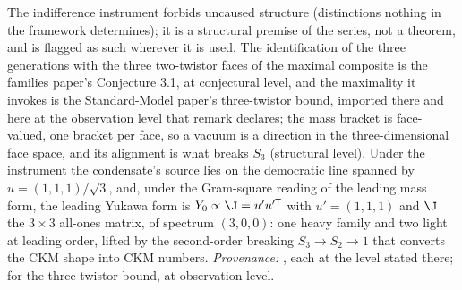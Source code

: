 The indifference instrument forbids uncaused structure (distinctions nothing in the framework determines); it is a structural premise of the series, not a theorem, and is flagged as such wherever it is used. The identification of the three generations with the three two-twistor faces of the maximal composite is the families paper's Conjecture 3.1, at conjectural level, and the maximality it invokes is the Standard-Model paper's three-twistor bound, imported there and here at the observation level that remark declares; the mass bracket is face-valued, one bracket per face, so a vacuum is a direction in the three-dimensional face space, and its alignment is what breaks $S_{3}$ (structural level). Under the instrument the condensate's source lies on the democratic line spanned by $u = (1,1,1)/\sqrt{3}$, and, under the Gram-square reading of the leading mass form, the leading Yukawa form is $Y_{0} \propto \J = u'u'^{\mathsf{T}}$ with $u' = (1,1,1)$ and $\J$ the $3 \times 3$ all-ones matrix, of spectrum $(3, 0, 0)$: one heavy family and two light at leading order, lifted by the second-order breaking $S_{3} \to S_{2} \to 1$ that converts the CKM shape into CKM numbers. \emph{Provenance:} \cite[Fact~2.5, Conj.~3.1, Prop.~4.3, Prop.~4.4(1)]{ButlerT13}, each at the level stated there; \cite[Rem.~3.3]{ButlerT12} for the three-twistor bound, at observation level.
